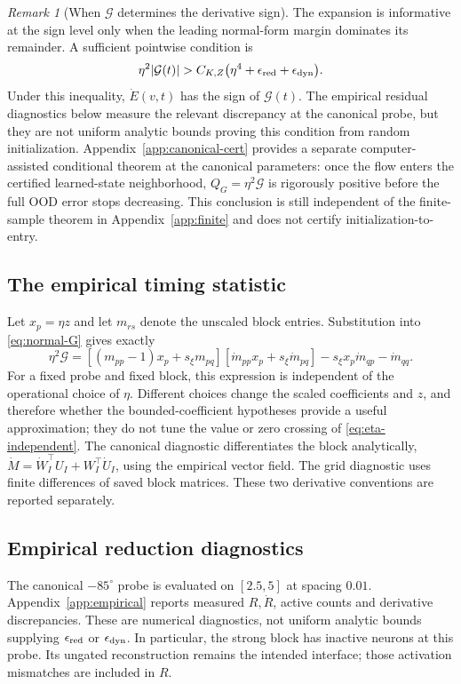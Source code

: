 \documentclass[10pt]{article}
\theoremstyle{remark}\newtheorem{remark}[theorem]{Remark}
\begin{document}
\begin{remark}[When $\mathcal G$ determines the derivative sign]
The expansion is informative at the sign level only when the leading
normal-form margin dominates its remainder. A sufficient pointwise
condition is
\[
 \eta^2|\mathcal G(t)|
 >
 C_{K,Z}\bigl(\eta^4+\epsilon_{\rm red}+\epsilon_{\rm dyn}\bigr).
\]
Under this inequality, $\dot E(v,t)$ has the sign of $\mathcal G(t)$.
The empirical residual diagnostics below measure the relevant discrepancy
at the canonical probe, but they are not uniform analytic bounds proving
this condition from random initialization. Appendix~\ref{app:canonical-cert}
provides a separate computer-assisted conditional theorem at the canonical
parameters: once the flow enters the certified learned-state neighborhood,
$Q_G=\eta^2\mathcal G$ is rigorously positive before the full OOD error stops
decreasing. This conclusion is still independent of the finite-sample theorem
in Appendix~\ref{app:finite} and does not certify initialization-to-entry.
\end{remark}

\subsection{The empirical timing statistic}
Let $x_p=\eta z$ and let $m_{rs}$ denote the unscaled block entries.
Substitution into \eqref{eq:normal-G} gives exactly
\begin{equation}\label{eq:eta-independent}
 \eta^2\mathcal G=
 [(m_{pp}-1)x_p+s_\xi m_{pq}]
 [\dot m_{pp}x_p+s_\xi\dot m_{pq}]
 -s_\xi x_p\dot m_{qp}-\dot m_{qq}.
\end{equation}
For a fixed probe and fixed block, this expression is independent of the
operational choice of $\eta$. Different choices change the scaled
coefficients and $z$, and therefore whether the bounded-coefficient
hypotheses provide a useful approximation; they do not tune the value
or zero crossing of \eqref{eq:eta-independent}.
The canonical diagnostic differentiates the block analytically,
$\dot M=\dot W_I^\top U_I+W_I^\top\dot U_I$, using the empirical
vector field. The grid diagnostic uses finite differences of saved block
matrices. These two derivative conventions are reported separately.

\subsection{Empirical reduction diagnostics}
The canonical $-85^\circ$ probe is evaluated on $[2.5,5]$ at spacing
$0.01$. Appendix~\ref{app:empirical} reports measured $R,\dot R$,
active counts and derivative discrepancies. These are numerical diagnostics,
not uniform analytic bounds supplying $\epsilon_{\rm red}$ or
$\epsilon_{\rm dyn}$. In particular, the strong block has inactive neurons
at this probe. Its ungated reconstruction remains the intended interface;
those activation mismatches are included in $R$.
\end{document}
